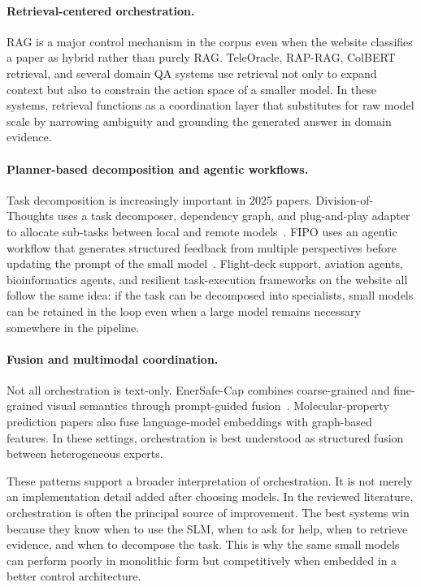 \paragraph{Retrieval-centered orchestration.}
RAG is a major control mechanism in the corpus even when the website classifies a paper as hybrid rather than purely RAG. TeleOracle, RAP-RAG, ColBERT retrieval, and several domain QA systems use retrieval not only to expand context but also to constrain the action space of a smaller model. In these systems, retrieval functions as a coordination layer that substitutes for raw model scale by narrowing ambiguity and grounding the generated answer in domain evidence.

\paragraph{Planner-based decomposition and agentic workflows.}
Task decomposition is increasingly important in 2025 papers. Division-of-Thoughts uses a task decomposer, dependency graph, and plug-and-play adapter to allocate sub-tasks between local and remote models~\cite{shao2025dot}. FIPO uses an agentic workflow that generates structured feedback from multiple perspectives before updating the prompt of the small model~\cite{amarasinghe2025fipo}. Flight-deck support, aviation agents, bioinformatics agents, and resilient task-execution frameworks on the website all follow the same idea: if the task can be decomposed into specialists, small models can be retained in the loop even when a large model remains necessary somewhere in the pipeline.

\paragraph{Fusion and multimodal coordination.}
Not all orchestration is text-only. EnerSafe-Cap combines coarse-grained and fine-grained visual semantics through prompt-guided fusion~\cite{cao2025enersafe}. Molecular-property prediction papers also fuse language-model embeddings with graph-based features. In these settings, orchestration is best understood as structured fusion between heterogeneous experts.

These patterns support a broader interpretation of orchestration. It is not merely an implementation detail added after choosing models. In the reviewed literature, orchestration is often the principal source of improvement. The best systems win because they know when to use the SLM, when to ask for help, when to retrieve evidence, and when to decompose the task. This is why the same small models can perform poorly in monolithic form but competitively when embedded in a better control architecture.


